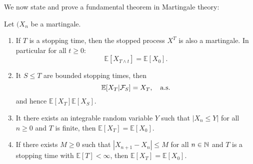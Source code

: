 \documentclass{article}
\begin{document}
We now state and prove a fundamental theorem in Martingale theory: 

\begin{theorem}\label{thm: optional stopping discrete time}
Let $ (X_{n}$ be a martingale. 
\begin{enumerate}
	\item If $ T$ is a stopping time, then the stopped process $ X^{T}$ is also a martingale. In particular for all $ t\geq 0$:
		\[
			\mathbb{E}[X_{T\land t}] =\mathbb{E}[X_{0}].
		\]
	\item It $ S\leq T$ are bounded stopping times, then 
		\[
			\mathbb{E}[X_{T}|\mathcal{F}_{S}] = X_{T}, \quad \text{a.s.}
		\]
		and hence $ \mathbb{E}[X_{T}] \mathbb{E}[X_{S}]$.
	\item It there exists an integrable random variable $ Y$ such that $ |X_{n}\leq Y|$ for all $ n \geq 0 $ and $ T$ is finite, then $ \mathbb{E}[X_{T}]= \mathbb{E}[X_{0}]$.
	\item If there exists $ M\geq 0$ such that $ |X_{n+1}-X_{n}|\leq M$ for all $ n\in \mathbb{N}$ and $ T$ is a stopping time with $ \mathbb{E}[T]<\infty$, then $ \mathbb{E}[X_{T}]= \mathbb{E}[X_{0}]$.
\end{enumerate}

\end{theorem}
\end{document}

